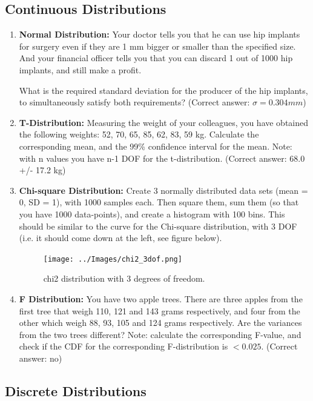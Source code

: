 \subsection*{Continuous Distributions }
\begin{enumerate}
    \item \textbf{Normal Distribution:} Your doctor tells you that he can use hip implants for surgery even if they are 1 mm bigger or smaller than the specified size. And your financial officer tells you that you can discard 1 out of 1000 hip implants, and still make a profit.

        What is the required standard deviation for the producer of the hip implants, to simultaneously satisfy both requirements?
        (Correct answer: $\sigma=0.304 mm$)
    \item \textbf{T-Distribution:} Measuring the weight of your colleagues, you have obtained the following weights: 52, 70, 65, 85, 62, 83, 59 kg.
    Calculate the corresponding mean, and the 99\% confidence interval for the mean. Note: with n values you have n-1 DOF for the t-distribution.
    (Correct answer: 68.0 +/- 17.2 kg)

    \item \textbf{Chi-square Distribution:} Create 3 normally distributed data sets (mean = 0, SD = 1), with 1000 samples each. Then square them, sum them (so that you have 1000 data-points), and create a histogram with 100 bins. This should be similar to the curve for the Chi-square distribution, with 3 DOF (i.e. it should come down at the left, see figure below).
    \begin{figure}
      \centering
      \texttt{[image: ../Images/chi2\_3dof.png]}\\
      \caption{chi2 distribution with 3 degrees of freedom.}\label{fig:chi23dof}
    \end{figure}

    \item \textbf{F Distribution:} You have two apple trees. There are three apples from the first tree that weigh 110, 121 and 143 grams respectively, and four from the other which weigh 88, 93, 105 and 124 grams respectively. Are the variances from the two trees different?
    Note: calculate the corresponding F-value, and check if the CDF for the corresponding F-distribution is $<0.025$.
    (Correct answer: no)
\end{enumerate}
\subsection*{Discrete Distributions }

